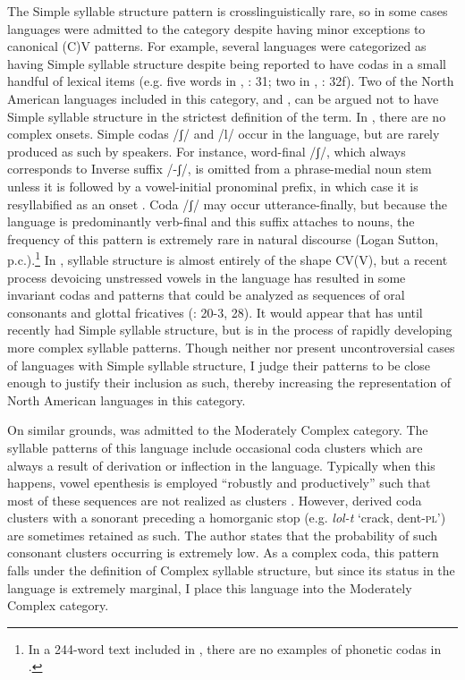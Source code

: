   The Simple syllable structure pattern is crosslinguistically rare, so in some cases languages were admitted to the category despite having minor exceptions to canonical (C)V patterns. For example, several languages were categorized as having Simple syllable structure despite being reported to have codas in a small handful of lexical items (e.g. five words in , \citealt{Guillaume2008}: 31; two in , \citealt{Pan2012}: 32f). Two of the North American languages included in this category,  and , can be argued not to have Simple syllable structure in the strictest definition of the term. In , there are no complex onsets. Simple codas /ʃ/ and /l/ occur in the language, but are rarely produced as such by speakers. For instance, word-final /ʃ/, which always corresponds to Inverse suffix /-ʃ/, is omitted from a phrase-medial noun stem unless it is followed by a vowel-initial pronominal prefix, in which case it is resyllabified as an onset \citep[22-24]{Yumitani1998}. Coda /ʃ/ may occur utterance-finally, but because the language is predominantly verb-final and this suffix attaches to nouns, the frequency of this pattern is extremely rare in natural discourse (Logan Sutton, p.c.).\footnote{{In a 244-word text included in \citet{Yumitani1998}, there are no examples of phonetic codas in .}} In , syllable structure is almost entirely of the shape CV(V), but a recent process devoicing unstressed vowels in the language has resulted in some invariant codas and patterns that could be analyzed as sequences of oral consonants and glottal fricatives (\citealt{Givón2011}: 20-3, 28). It would appear that  has until recently had Simple syllable structure, but is in the process of rapidly developing more complex syllable patterns. Though neither  nor  present uncontroversial cases of languages with Simple syllable structure, I judge their patterns to be close enough to justify their inclusion as such, thereby increasing the representation of North American languages in this category. 

  On similar grounds,  was admitted to the Moderately Complex category. The syllable patterns of this language include occasional coda clusters which are always a result of derivation or inflection in the language. Typically when this happens, vowel epenthesis is employed “robustly and productively” such that most of these sequences are not realized as clusters \citep[55]{Filchenko2007}. However, derived coda clusters with a sonorant preceding a homorganic stop (e.g. \textit{lol-t} ‘crack, dent-\textsc{pl’}) are sometimes retained as such. The author states that the probability of such consonant clusters occurring is extremely low. As a complex coda, this pattern falls under the definition of Complex syllable structure, but since its status in the language is extremely marginal, I place this language into the Moderately Complex category.

